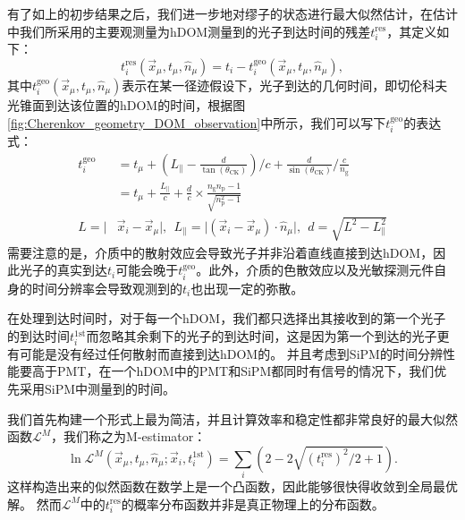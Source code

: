 有了如上的初步结果之后，我们进一步地对缪子的状态进行最大似然估计，在估计中我们所采用的主要观测量为hDOM测量到的光子到达时间的残差$t_i^\mathrm{res}$\cite{AMANDA_track_reco:2003}，其定义如下：
\begin{equation}
    t_i^\mathrm{res}(\vec{x}_\mu, t_\mu, \hat{n}_\mu) = t_i - t_i^\mathrm{geo}(\vec{x}_\mu, t_\mu, \hat{n}_\mu),
\end{equation}
其中$t_i^\mathrm{geo}(\vec{x}_\mu, t_\mu, \hat{n}_\mu)$表示在某一径迹假设下，光子到达的几何时间，即切伦科夫光锥面到达该位置的hDOM的时间，根据图\ref{fig:Cherenkov_geometry_DOM_observation}中所示，我们可以写下$t_i^\mathrm{geo}$的表达式：
\begin{equation}
\begin{aligned}
    t_i^\mathrm{geo} &= t_\mu + (L_\parallel - \frac{d}{\tan(\theta_\mathrm{CK})}) / c + \frac{d}{\sin(\theta_\mathrm{CK})} / \frac{c}{n_\mathrm{g}} \\
    &= t_\mu + \frac{L_\parallel}{c} + \frac{d}{c} \times 
    \frac{n_\mathrm{g} n_\mathrm{p} - 1}{\sqrt{n_\mathrm{p}^2 - 1}} \\
    L = \lvert &\vec{x}_i - \vec{x}_\mu \rvert, ~~
    L_\parallel = \lvert (\vec{x}_i - \vec{x}_\mu) \cdot \hat{n}_\mu \rvert, ~~ d = \sqrt{L^2 - L_\parallel^2}
    \label{eq:t_geo}
\end{aligned}
\end{equation}
需要注意的是，介质中的散射效应会导致光子并非沿着直线直接到达hDOM，因此光子的真实到达$t_i$可能会晚于$t_i^\mathrm{geo}$。此外，介质的色散效应以及光敏探测元件自身的时间分辨率会导致观测到的$t_i$也出现一定的弥散。

在处理到达时间时，对于每一个hDOM，我们都只选择出其接收到的第一个光子的到达时间$t_i^\mathrm{1st}$而忽略其余剩下的光子的到达时间，这是因为第一个到达的光子更有可能是没有经过任何散射而直接到达hDOM的。
并且考虑到SiPM的时间分辨性能要高于PMT，在一个hDOM中的PMT和SiPM都同时有信号的情况下，我们优先采用SiPM中测量到的时间。

我们首先构建一个形式上最为简洁，并且计算效率和稳定性都非常良好的最大似然函数$\mathcal{L}^M$，我们称之为M-estimator：
\begin{equation}
    \ln \mathcal{L}^M(\vec{x}_\mu, t_\mu, \hat{n}_\mu; \vec{x}_i, t_i^\mathrm{1st}) = 
    \sum_i \left(2 - 2 \sqrt{ (t_i^\mathrm{res})^2/2 + 1 } \right) .
\end{equation}
这样构造出来的似然函数在数学上是一个凸函数，因此能够很快得收敛到全局最优解。
然而$\mathcal{L}^M$中的$t_i^\mathrm{res}$的概率分布函数并非是真正物理上的分布函数。

